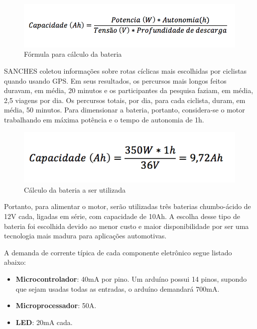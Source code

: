 	\graphicspath{{figuras/}}
	\begin{figure}[h!]
	\centering
	\includegraphics[scale=1.0]{capacidade_bateria}
	\caption{Fórmula para cálculo da bateria}
	\label{img:formula_capacidade}
	\end{figure}
	

	SANCHES \cite{daanalise} coletou informações sobre rotas cíclicas mais escolhidas por ciclistas quando usando GPS. Em seus resultados, os percursos mais longos feitos duravam, em média, 20 minutos e os participantes da pesquisa faziam, em média, 2,5 viagens por dia. Os percursos totais, por dia, para cada ciclista, duram, em média, 50 minutos. Para dimensionar a bateria, portanto, considera-se o motor trabalhando em máxima potência e o tempo de autonomia de 1h.
	
	\graphicspath{{figuras/}}
	\begin{figure}[h!]
	\centering
	\includegraphics[scale=1.0]{calculo_capacidade}
	\caption{Cálculo da bateria a ser utilizada}
	\label{img:calculo_bateria}
	\end{figure}
	
	Portanto, para alimentar o motor, serão utilizadas três baterias chumbo-ácido de 12V cada, ligadas em série, com capacidade de 10Ah. A escolha desse tipo de bateria foi escolhida devido ao menor custo e maior disponibilidade por ser uma tecnologia mais madura para aplicações automotivas.

	A demanda de corrente típica de cada componente eletrônico segue listado abaixo:
	
	\begin{itemize}
		\item \textbf{Microcontrolador}: 40mA por pino. Um arduíno possui 14 pinos, supondo que sejam usadas todas as entradas, o arduíno demandará 700mA.
		\item \textbf{Microprocessador}: 50A.
		\item \textbf{LED}: 20mA cada.

	\end{itemize}


